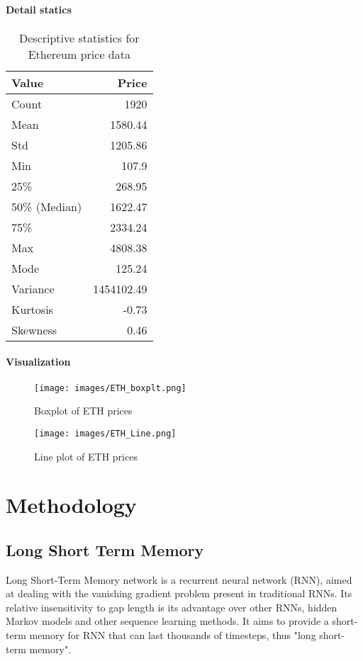 \documentclass{ieeeojies}
\begin{document}
\paragraph{Detail statics}
\begin{table}[H]
\centering
\begin{tabular}{|l|r|}
\hline
\textbf{Value} & \textbf{Price} \\
\hline
Count & 1920 \\
\hline
Mean & 1580.44 \\
\hline
Std & 1205.86 \\
\hline
Min & 107.9 \\
\hline
25\% & 268.95 \\
\hline
50\% (Median) & 1622.47 \\
\hline
75\% & 2334.24 \\
\hline
Max & 4808.38 \\
\hline
Mode & 125.24 \\
\hline
Variance & 1454102.49 \\
\hline
Kurtosis & -0.73 \\
\hline
Skewness & 0.46 \\
\hline
\end{tabular}
\caption{Descriptive statistics for Ethereum price data}
\label{table:ethereum_statistics}
\end{table}

\paragraph{Visualization}
\begin{figure}[H] %
    \centering
    \texttt{[image: images/ETH\_boxplt.png]}
    \caption{Boxplot of ETH prices}
    \label{fig:eth_boxplot}
\end{figure}

\begin{figure}[H] %
    \centering
    \texttt{[image: images/ETH\_Line.png]}
    \caption{Line plot of ETH prices}
    \label{fig:eth_lineplot}
\end{figure}

\section{Methodology}
\subsection{Long Short Term Memory}
Long Short-Term Memory network is a recurrent neural network (RNN), aimed at dealing with the vanishing gradient problem present in traditional RNNs. Its relative insensitivity to gap length is its advantage over other RNNs, hidden Markov models and other sequence learning methods. It aims to provide a short-term memory for RNN that can last thousands of timesteps, thus "long short-term memory".
\end{document}
